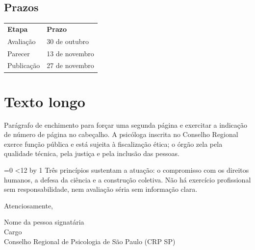 \documentclass{crpsp-timbrado}
\begin{document}
\subsection{Prazos}

\begin{tabular}{@{}ll@{}}
  \textbf{Etapa}  & \textbf{Prazo}    \\
  Avaliação       & 30 de outubro     \\
  Parecer         & 13 de novembro    \\
  Publicação      & 27 de novembro    \\
\end{tabular}

\section{Texto longo}

Parágrafo de enchimento para forçar uma segunda página e exercitar a indicação
de número de página no cabeçalho. A psicóloga inscrita no Conselho Regional
exerce função pública e está sujeita à fiscalização ética; o órgão zela pela
qualidade técnica, pela justiça e pela inclusão das pessoas.

=0
\loop\ifnum{}<12
  \advance{} by 1
  Três princípios sustentam a atuação: o compromisso com os direitos humanos, a
  defesa da ciência e a construção coletiva. Não há exercício profissional sem
  responsabilidade, nem avaliação séria sem informação clara.\par
\repeat

\bigskip
\noindent Atenciosamente,

\bigskip\bigskip
\noindent Nome da pessoa signatária\\
Cargo\\
Conselho Regional de Psicologia de São Paulo (CRP SP)
\end{document}
